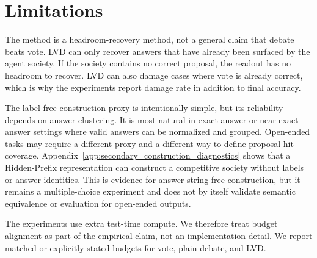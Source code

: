 \section{Limitations}\label{appsec:limitation}
The method is a headroom-recovery method, not a general claim that debate beats
vote. LVD can only recover answers that have already been surfaced by the agent
society. If the society contains no correct proposal, the readout has no
headroom to recover. LVD can also damage cases where vote is already correct,
which is why the experiments report damage rate in addition to final accuracy.

The label-free construction proxy is intentionally simple, but its reliability
depends on answer clustering. It is most natural in exact-answer or
near-exact-answer settings where valid answers can be normalized and grouped.
Open-ended tasks may require a different proxy and a different way to define
proposal-hit coverage. Appendix~\ref{app:secondary_construction_diagnostics}
shows that a Hidden-Prefix representation can construct a competitive society
without labels or answer identities. This is evidence for answer-string-free
construction, but it remains a multiple-choice experiment and does not by
itself validate semantic equivalence or evaluation for open-ended outputs.

The experiments use extra test-time compute. We therefore treat budget alignment
as part of the empirical claim, not an implementation detail. We report matched
or explicitly stated budgets for vote, plain debate, and LVD.
